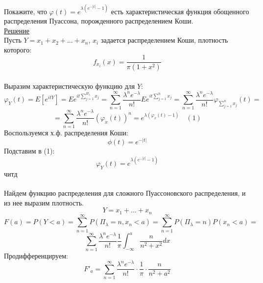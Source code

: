 \documentclass{article}
\begin{document}
\Large
Покажите, что $\varphi(t) = e^{\lambda(e^{-|t|} - 1)}$ есть 
характеристическая функция обощенного распределения Пуассона,
порожденного распределением Коши.
\\
\underline{Решение}
\\
Пусть $Y = x_1 + x_2 + ... + x_n$, $x_i$ задается распределением Коши, плотность которого: \[f_{x_i} (x) = \frac{1}{\pi (1 + x^2)} \]
\\
Выразим характеристическую функцию для $Y$:
\[
  \varphi_{Y} (t) = E[e^{itY}] = 
  Ee^{it\sum_{j = 1}^{\Pi_\lambda} x_j } = 
  \sum_{n = 1}^{\infty} \frac{\lambda^n e^{-\lambda}}{n!} 
  Ee^{it\sum_{j = 1}^{n} x_j} =
  \sum_{n = 1}^{\infty} \frac{\lambda^n e^{-\lambda}}{n!} \varphi_{\sum_{j = 1}^{n}x_j} (t) = 
\]
\[
  = \sum_{n = 1}^{\infty} \frac{\lambda^n e^{-\lambda}}{n!} \left( \varphi_{x} (t)\right)^n 
  = e^{\lambda (\varphi_{x} (t) - 1)} \quad(1)
\]
Воспользуемся х.ф. распределения Коши:
\[
    \phi(t) = e^{-|t|}
\]
Подставим в (1):
\[
    \varphi_{Y} (t) = e^{\lambda(e^{-|t|} - 1)}
\]
читд
\\
\\
Найдем функцию распределения для сложного Пуассоновского распределения, и из нее выразим плотность.
\[Y = x_1 + ... + x_n \]
\[F(a) = P(Y < a) = \sum_{n = 1}^{\infty } P(\Pi_{\lambda} = n, x_n < a) = \sum_{n = 1}^{\infty } P(\Pi_\lambda = n) P(x_n < a) =
\]
\[ \sum_{n = 1}^{\infty} \frac{\lambda^n e^{-\lambda}}{n!}  \frac{1}{\pi}\int_{-\infty}^{a} \frac{n}{n^2 + x^2}dx \]
Продифференцируем:
\[
  F'_{a} = \sum_{n = 1}^{\infty}  \frac{\lambda^n e^{-\lambda}}{n!} \cdot \frac{1}{\pi} \cdot \frac{n}{n^2 + a^2}
\]
\end{document}
